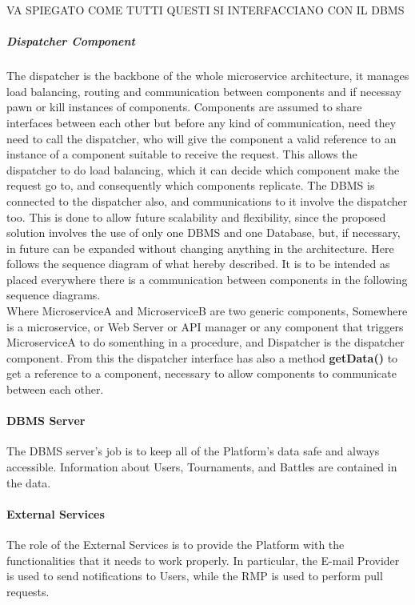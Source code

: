 VA SPIEGATO COME TUTTI QUESTI SI INTERFACCIANO CON IL DBMS
\newpage
{}
\newpage
\subparagraph*{Dispatcher Component}
The dispatcher is the backbone of the whole microservice architecture, it manages load balancing, routing and communication between components and if necessay pawn or kill instances of components. 
Components are assumed to share interfaces between each other but before any kind of communication, need they need to call the dispatcher, who will give the component a valid reference to an instance of a component suitable to receive the request.
This allows the dispatcher to do load balancing, which it can decide which component make the request go to, and consequently which components replicate.
The DBMS is connected to the dispatcher also, and communications to it involve the dispatcher too. 
This is done to allow future scalability and flexibility, since the proposed solution involves the use of only one DBMS and one Database, but, if necessary, in future can be expanded without changing anything in the architecture.
Here follows the sequence diagram of what hereby described. It is to be intended as placed everywhere there is a communication between components in the following sequence diagrams.\\
Where MicroserviceA and MicroserviceB are two generic components, Somewhere is a microservice, or Web Server or API manager or any component that triggers MicroserviceA to do somenthing in a procedure, and Dispatcher is the dispatcher component.
From this the dispatcher interface has also a method \textbf{getData()} to get a reference to a component, necessary to allow components to communicate between each other.\\


\paragraph{DBMS Server}
The DBMS server's job is to keep all of the Platform's data safe and always accessible. Information about Users, Tournaments, and Battles are contained in the data.

\paragraph{External Services}
The role of the External Services is to provide the Platform with the functionalities that it needs to work properly. In particular, the E-mail Provider is used to send notifications to Users, while the RMP is used to perform pull requests.            
\newpage

